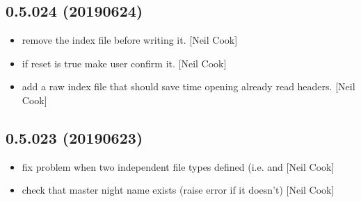 \documentclass[a4paper,10pt,english]{report}
\begin{document}
\subsection{0.5.024 (2019\sphinxhyphen{}06\sphinxhyphen{}24)}
\label{\detokenize{misc/changelog:id132}}\begin{itemize}
\item {} 
 \sphinxhyphen{} remove the index file before writing it. {[}Neil Cook{]}

\item {} 
 \sphinxhyphen{} if reset is true make user confirm it. {[}Neil Cook{]}

\item {} 
 \sphinxhyphen{} add a raw index file that should save time opening
already read headers. {[}Neil Cook{]}

\end{itemize}


\subsection{0.5.023 (2019\sphinxhyphen{}06\sphinxhyphen{}23)}
\label{\detokenize{misc/changelog:id133}}\begin{itemize}
\item {} 
 \sphinxhyphen{} fix problem when two independent file types defined
(i.e.  and  {[}Neil Cook{]}

\item {} 
 \sphinxhyphen{} check that master night name exists (raise error if it
doesn’t) {[}Neil Cook{]}

\end{itemize}
\end{document}
